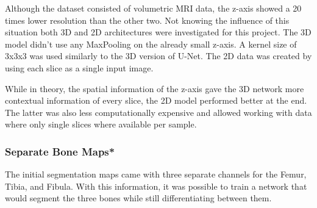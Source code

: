 Although the dataset consisted of volumetric MRI data, the z-axis showed a 20 times lower resolution than the other two. Not knowing the influence of this situation both 3D and 2D architectures were investigated for this project. The 3D model didn't use any MaxPooling on the already small z-axis. A kernel size of 3x3x3 was used similarly to the 3D version of U-Net. The 2D data was created by using each slice as a single input image. 

While in theory, the spatial information of the z-axis gave the 3D network more contextual information of every slice, the 2D model performed better at the end. The latter was also less computationally expensive and allowed working with data where only single slices where available per sample.

\subsubsection{Separate Bone Maps*}

The initial segmentation maps came with three separate channels for the Femur, Tibia, and Fibula. With this information, it was possible to train a network that would segment the three bones while still differentiating between them.

